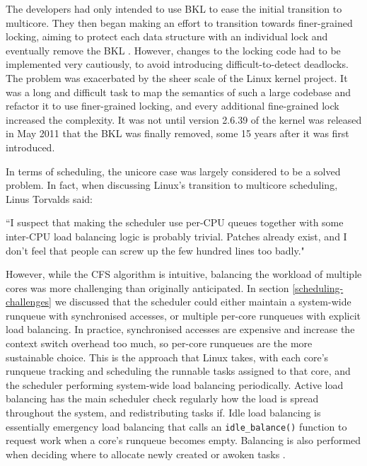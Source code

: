 \documentclass[bsc,frontabs,singlespacing,parskip,deptreport]{infthesis}
\begin{document}
The developers had only intended to use BKL to ease the initial transition to multicore. They then began making an effort to transition towards finer-grained locking, aiming to protect each data structure with an individual lock and eventually remove the BKL \cite{locking-smp-kernels}. However, changes to the locking code had to be implemented very cautiously, to avoid introducing difficult-to-detect deadlocks. The problem was exacerbated by the sheer scale of the Linux kernel project.  It was a long and difficult task to map the semantics of such a large codebase and refactor it to use finer-grained locking, and every additional fine-grained lock increased the complexity. It was not until version 2.6.39 of the kernel was released in May 2011 that the BKL was finally removed, some 15 years after it was first introduced. 

In terms of scheduling, the unicore case was largely considered to be a solved problem. In fact, when discussing Linux's transition to multicore scheduling, Linus Torvalds said:

\begin{displayquote}
``I suspect that making the
scheduler use per-CPU queues together with some inter-CPU load balancing
logic is probably trivial. Patches already exist, and I don't feel that
people can screw up the few hundred lines too badly." \cite{lwn-sched-easy}
\end{displayquote} 

However, while the CFS algorithm is intuitive, balancing the workload of multiple cores was more challenging than originally anticipated. In section \ref{scheduling-challenges} we discussed that the scheduler could either maintain a system-wide runqueue with synchronised accesses, or multiple per-core runqueues with explicit load balancing. In practice, synchronised accesses are expensive and increase the context switch overhead too much, so per-core runqueues are the more sustainable choice. This is the approach that Linux takes, with each core's runqueue tracking and scheduling the runnable tasks assigned to that core, and the scheduler performing system-wide load balancing periodically. Active load balancing has the main scheduler check regularly how the load is spread throughout the system, and redistributing tasks if. Idle load balancing is essentially emergency load balancing that calls an \verb|idle_balance()| function to request work when a core's runqueue becomes empty. Balancing is also performed when deciding where to allocate newly created or awoken tasks \cite{seeker}. 
\end{document}
